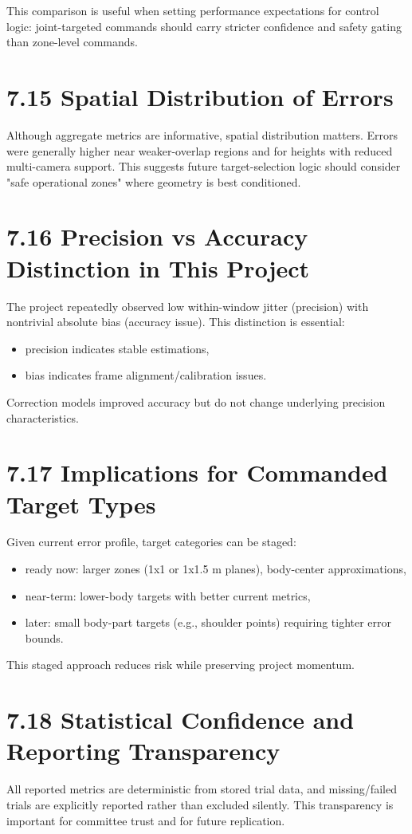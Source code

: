 This comparison is useful when setting performance expectations for control logic: joint-targeted commands should carry stricter confidence and safety gating than zone-level commands.

\section{7.15 Spatial Distribution of Errors}
Although aggregate metrics are informative, spatial distribution matters. Errors were generally higher near weaker-overlap regions and for heights with reduced multi-camera support. This suggests future target-selection logic should consider "safe operational zones" where geometry is best conditioned.

\section{7.16 Precision vs Accuracy Distinction in This Project}
The project repeatedly observed low within-window jitter (precision) with nontrivial absolute bias (accuracy issue). This distinction is essential:
\begin{itemize}
  \item precision indicates stable estimations,
  \item bias indicates frame alignment/calibration issues.
\end{itemize}

Correction models improved accuracy but do not change underlying precision characteristics.

\section{7.17 Implications for Commanded Target Types}
Given current error profile, target categories can be staged:
\begin{itemize}
  \item ready now: larger zones (1x1 or 1x1.5 m planes), body-center approximations,
  \item near-term: lower-body targets with better current metrics,
  \item later: small body-part targets (e.g., shoulder points) requiring tighter error bounds.
\end{itemize}

This staged approach reduces risk while preserving project momentum.

\section{7.18 Statistical Confidence and Reporting Transparency}
All reported metrics are deterministic from stored trial data, and missing/failed trials are explicitly reported rather than excluded silently. This transparency is important for committee trust and for future replication.



